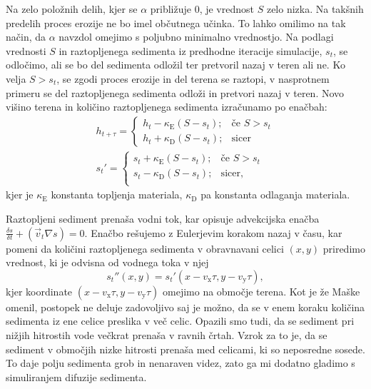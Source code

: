 \documentclass[9pt]{style/friteza}
\begin{document}
Na zelo položnih delih, kjer se $\alpha$ približuje 0, je vrednost $S$ zelo nizka. Na takšnih predelih proces erozije ne bo imel občutnega učinka. To lahko omilimo na tak način, da $\alpha$ navzdol omejimo s poljubno minimalno vrednostjo. Na podlagi vrednosti $S$ in raztopljenega sedimenta iz predhodne iteracije simulacije, $s_t$, se odločimo, ali se bo del sedimenta odložil ter pretvoril nazaj v teren ali ne. Ko velja $S > s_t$, se zgodi proces erozije in del terena se raztopi, v nasprotnem primeru se del raztopljenega sedimenta odloži in pretvori nazaj v teren. Novo višino terena in količino raztopljenega sedimenta izračunamo po enačbah:
\begin{eqnarray}
h_{t+\tau} =
\begin{cases}
h_t - \kappa_\mathrm{E} (S - s_t); &\text{če } S > s_t\\
h_t + \kappa_\mathrm{D} (S - s_t); &\text{sicer}
\end{cases}\\
{s_{t}}' =
\begin{cases}
s_t + \kappa_\mathrm{E} (S - s_t); &\text{če } S > s_t\\
s_t - \kappa_\mathrm{D} (S - s_t); &\text{sicer,}\\
\end{cases}
\end{eqnarray}
kjer je $\kappa_\mathrm{E}$ konstanta topljenja materiala, $\kappa_\mathrm{D}$ pa konstanta odlaganja materiala.

Raztopljeni sediment prenaša vodni tok, kar opisuje advekcijska enačba $\frac{\delta s}{\delta t} + (\vec{v}_t \nabla s) = 0$.
Enačbo rešujemo z Eulerjevim korakom nazaj v času, kar pomeni da količini raztopljenega sedimenta v obravnavani celici $(x,y)$ priredimo vrednost, ki je odvisna od vodnega toka v njej
\begin{equation}
{s_{t}}''(x,y) = {s_{t}}'(x - v_\mathrm{x} \tau, y - v_\mathrm{y} \tau),
\end{equation}
kjer koordinate $(x - v_\mathrm{x} \tau, y - v_\mathrm{y} \tau)$ omejimo na območje terena. Kot je že Maške \cite{maske_2013} omenil, postopek ne deluje zadovoljivo saj je možno, da se v enem koraku količina sedimenta iz ene celice preslika v več celic. Opazili smo tudi, da se sediment pri nižjih hitrostih vode večkrat prenaša v ravnih črtah. Vzrok za to je, da se sediment v območjih nizke hitrosti prenaša med celicami, ki so neposredne sosede. To daje polju sedimenta grob in nenaraven videz, zato ga mi dodatno gladimo s simuliranjem difuzije sedimenta.
\end{document}

